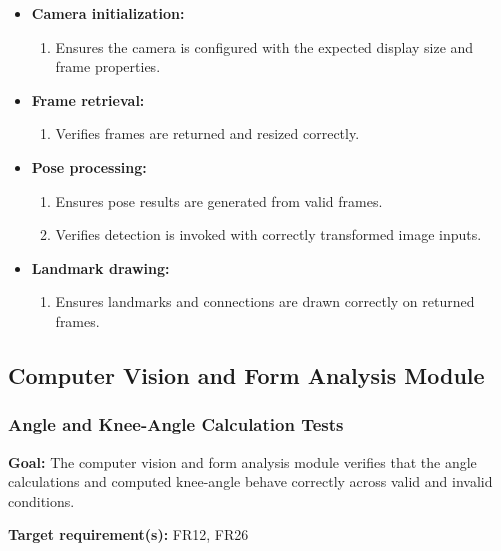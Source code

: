 \documentclass[12pt, titlepage]{article}
\begin{document}
\begin{itemize}
    \item \textbf{Camera initialization:}
    \begin{enumerate}
        \item Ensures the camera is configured with the expected display size and frame properties.
    \end{enumerate}

    \item \textbf{Frame retrieval:}
    \begin{enumerate}
        \item Verifies frames are returned and resized correctly.
    \end{enumerate}

    \item \textbf{Pose processing:}
    \begin{enumerate}
        \item Ensures pose results are generated from valid frames.
        \item Verifies detection is invoked with correctly transformed image inputs.
    \end{enumerate}

    \item \textbf{Landmark drawing:}
    \begin{enumerate}
        \item Ensures landmarks and connections are drawn correctly on returned frames.
    \end{enumerate}
\end{itemize}

\subsection{Computer Vision and Form Analysis Module}

\subsubsection{Angle and Knee-Angle Calculation Tests}

\textbf{Goal:} The computer vision and form analysis module verifies that the angle calculations and computed knee-angle behave correctly across valid and invalid conditions.

\textbf{Target requirement(s):} FR12, FR26
\end{document}
